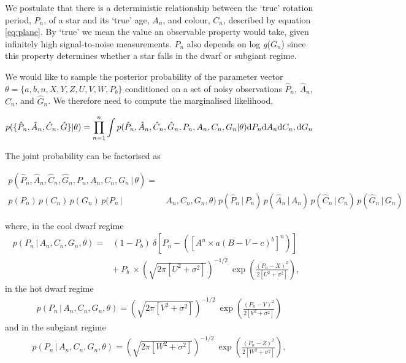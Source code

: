 \documentclass[10pt,preprint]{aastex}
\newcommand{\logg}{log \emph{g}}
\newcommand{\ah}{$\hat{A}_n$}
\newcommand{\ph}{$\hat{P}_n$}
\newcommand{\ch}{$\hat{C}_n$}
\newcommand{\gh}{$\hat{G}_n$}
\begin{document}
We postulate that there is a deterministic relationship between the `true' rotation period, $P_n$, of a star and its `true' age, $A_n$, and colour, $C_n$, described by equation \ref{eq:plane}.
By `true' we mean the value an observable property would take, given infinitely high signal-to-noise measurements.
$P_n$ also depends on \logg($G_n$) since this property determines whether a star falls in the dwarf or subgiant regime.

We would like to sample the posterior probability of the parameter vector $\theta = \{a, b, n, X, Y, Z, U, V, W, P_b\}$ conditioned on a set of noisy observations \ph, \ah, \ch, and \gh.
We therefore need to compute the marginalised likelihood,

\begin{equation}
	p(\{\hat{P}_n,\hat{A}_n,\hat{C}_n,\hat{G}\}|\theta) =
	\prod_{n=1}^{n} \int p(\hat{P}_n,\hat{A}_n,\hat{C}_n,\hat{G}_n,P_n,A_n,C_n,G_n|\theta)
	{\rm d}P_n {\rm d}A_n {\rm d}C_n,{\rm d}G_n
\label{eq:fulll}
\end{equation}

The joint probability can be factorised as

\begin{align}
	p(\hat{P}_n,\hat{A}_n,\hat{C}_n,\hat{G}_n,P_n,A_n,C_n,G_n\,|\,\theta) = & \nonumber \\
	p(P_n)\,p(C_n)\,p(G_n)\,p(P_n\,| & \,A_n,C_n,G_n,\theta)\
        p(\hat{P}_n\,|\,P_n)\,p(\hat{A}_n\,|\,A_n)\,p(\hat{C}_n\,|\,C_n)\,p(\hat{G}_n\,|\,G_n)
\nonumber
\end{align}

where, in the cool dwarf regime
\begin{eqnarray}
p(P_n\,|\,A_n,C_n,G_n,\theta) =
	& (1-P_b)~\delta \left [P_n - \left(\left[A^n \times a(B-V - c)^b\right]^n\right) \right] \quad \\
	& +~P_b~\times \left(\sqrt{2\pi[U^2+\sigma^2]}\right)^{-1/2}~\exp\left({\frac{(P_n-X)^2}{2[U^2+\sigma^2]}}\right),
\end{eqnarray}
in the hot dwarf regime
\begin{eqnarray}
p(P_n\,|\,A_n,C_n,G_n,\theta) = \left(\sqrt{2\pi[V^2+\sigma^2]}\right)^{-1/2}~\exp\left({\frac{(P_n-Y)^2}{2[V^2+\sigma^2]}}\right)
\end{eqnarray}
and in the subgiant regime
\begin{eqnarray}
p(P_n\,|\,A_n,C_n,G_n,\theta) = \left(\sqrt{2\pi[W^2+\sigma^2]}\right)^{-1/2}~\exp\left({\frac{(P_n-Z)^2}{2[W^2+\sigma^2]}}\right),
\end{eqnarray}
\end{document}
